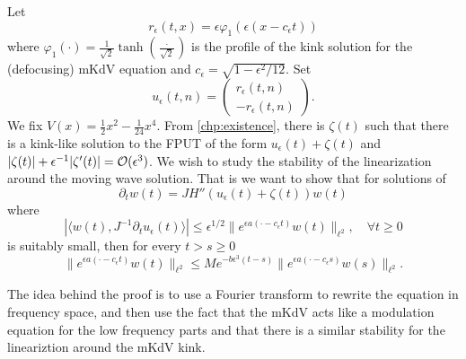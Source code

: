 Let 
\begin{equation*} 
	r_\epsilon(t,x) = \epsilon \varphi_1(\epsilon (x - c_\epsilon t))
\end{equation*} 
where \(\varphi_1(\cdot)=  \frac 1 {\sqrt 2 }\tanh(\frac \cdot {\sqrt 2})\) is the profile of the kink solution for the (defocusing) mKdV equation and \(c_\epsilon = \sqrt{1 - \epsilon^2/12}\). Set 
\begin{equation*} 
	u_{\epsilon} (t,n) = \begin{pmatrix}
		r_\epsilon(t,n) \\
		-r_\epsilon(t,n)
	\end{pmatrix}.
\end{equation*} 
We fix \(V(x) = \frac 1 2 x^2 - \frac 1 {24} x^4\). From \cref{chp:existence}, there is \(\zeta(t)\) such that there is a kink-like solution to the FPUT of the form \(u_\epsilon(t) + \zeta(t)\) and \(|\zeta(t)| + \epsilon^{-1} |\zeta'(t)| = \mathcal{O}( \epsilon^3)\). We wish to study the stability of the linearization around the moving wave solution. That is we want to show that for solutions of
\begin{equation}\label{linearization-eqn}
	\partial_t w (t) = J H''(u_\epsilon(t) + \zeta(t))w(t)
\end{equation}
where 
\begin{equation}\label{orthogonality-condition}
	|\langle w(t), J^{-1} \partial_t u_{\epsilon} (t) \rangle| \leq \epsilon^{1/2} \| e ^{\epsilon a (\cdot - c_\epsilon t)} w(t) \|_{\ell^2}, \quad \forall t \geq 0
\end{equation}
is suitably small, then for every \(t > s \geq 0\)
\begin{equation}\label{exponential-linear-stability}
	\| e^{\epsilon a(\cdot - c_\epsilon t)} w(t) \|_{\ell^2} \leq M e^{-b\epsilon^3 (t-s)} \| e^{\epsilon a(\cdot - c_\epsilon s)} w(s) \|_{\ell^2} .
\end{equation}

The idea behind the proof is to use a Fourier transform to rewrite the equation in frequency space, and then use the fact that the mKdV acts like a modulation equation for the low frequency parts and that there is a similar stability for the lineariztion around the mKdV kink. 

